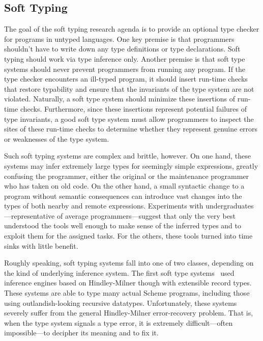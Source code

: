\begin{schemeregion}
\subsection{Soft Typing}

The goal of the soft typing research agenda is to provide an optional type
 checker for programs in untyped languages. One key premise is that
 programmers shouldn't have to write down any type definitions or type
 declarations. Soft typing should work via type inference only.
 Another premise is that soft type systems should never prevent
 programmers from running any program. If the type
 checker encounters an ill-typed program, it should insert run-time checks that
 restore typability and ensure that the invariants of the type system
 are not violated.
 Naturally, a soft type system should minimize these insertions of
 run-time checks. Furthermore, since these insertions represent potential
 failures of type invariants, a good soft type system must allow programmers
 to inspect the sites of these run-time checks to determine whether they
 represent genuine errors or weaknesses of the type system. 

 Such soft typing systems are  complex
 and brittle, however. On one hand, these systems may infer extremely large types
 for seemingly simple expressions, greatly confusing the
 programmer, either the original or the maintenance 
programmer who has taken on old code. On the other hand, a
 small syntactic change to a program without semantic consequences can
 introduce vast changes into the types of both nearby and remote
 expressions. Experiments with undergraduates---representative of 
 average programmers---suggest that only the very best understood the tools
 well enough to make sense of the inferred types and to exploit them for
 the assigned tasks. For the others, these tools turned into time sinks with
 little benefit.

Roughly speaking, soft typing systems fall into one of two classes, depending
 on the kind of underlying inference system. The first soft type
 systems~\cite{cf:pldi91,wc:toplas97,hr:fpca95, h:dynamic-article,
   am:static-types-dynamic-language} used inference engines 
 based on Hindley-Milner though with extensible record types. These systems
 are able to type many actual Scheme programs, including those using
 outlandish-looking recursive datatypes. Unfortunately, these systems
 severely suffer from the general Hindley-Milner error-recovery
 problem. That is, when the type system signals a type error, it is
 extremely difficult---often impossible---to decipher its meaning and to
 fix it.


\end{schemeregion}
